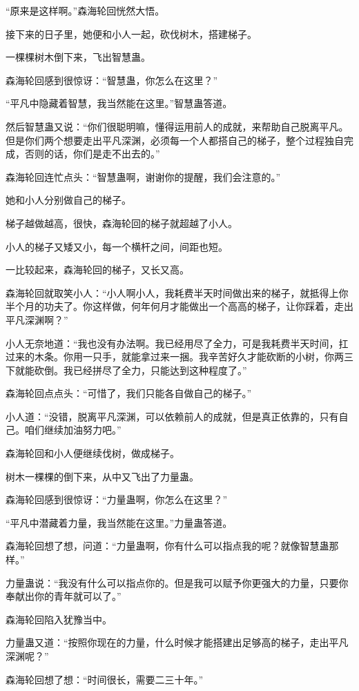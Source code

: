\begin{this_body}
“原来是这样啊。”森海轮回恍然大悟。

接下来的日子里，她便和小人一起，砍伐树木，搭建梯子。

一棵棵树木倒下来，飞出智慧蛊。

森海轮回感到很惊讶：“智慧蛊，你怎么在这里？”

“平凡中隐藏着智慧，我当然能在这里。”智慧蛊答道。

然后智慧蛊又说：“你们很聪明嘛，懂得运用前人的成就，来帮助自己脱离平凡。但是你们两个想要走出平凡深渊，必须每一个人都搭自己的梯子，整个过程独自完成，否则的话，你们是走不出去的。”

森海轮回连忙点头：“智慧蛊啊，谢谢你的提醒，我们会注意的。”

她和小人分别做自己的梯子。

梯子越做越高，很快，森海轮回的梯子就超越了小人。

小人的梯子又矮又小，每一个横杆之间，间距也短。

一比较起来，森海轮回的梯子，又长又高。

森海轮回就取笑小人：“小人啊小人，我耗费半天时间做出来的梯子，就抵得上你半个月的功夫了。你这样做，何年何月才能做出一个高高的梯子，让你踩着，走出平凡深渊啊？”

小人无奈地道：“我也没有办法啊。我已经用尽了全力，可是我耗费半天时间，扛过来的木条。你用一只手，就能拿过来一捆。我辛苦好久才能砍断的小树，你两三下就能砍倒。我已经拼尽了全力，只能达到这种程度了。”

森海轮回点点头：“可惜了，我们只能各自做自己的梯子。”

小人道：“没错，脱离平凡深渊，可以依赖前人的成就，但是真正依靠的，只有自己。咱们继续加油努力吧。”

森海轮回和小人便继续伐树，做成梯子。

树木一棵棵的倒下来，从中又飞出了力量蛊。

森海轮回感到很惊讶：“力量蛊啊，你怎么在这里？”

“平凡中潜藏着力量，我当然能在这里。”力量蛊答道。

森海轮回想了想，问道：“力量蛊啊，你有什么可以指点我的呢？就像智慧蛊那样。”

力量蛊说：“我没有什么可以指点你的。但是我可以赋予你更强大的力量，只要你奉献出你的青年就可以了。”

森海轮回陷入犹豫当中。

力量蛊又道：“按照你现在的力量，什么时候才能搭建出足够高的梯子，走出平凡深渊呢？”

森海轮回想了想：“时间很长，需要二三十年。”


\end{this_body}
